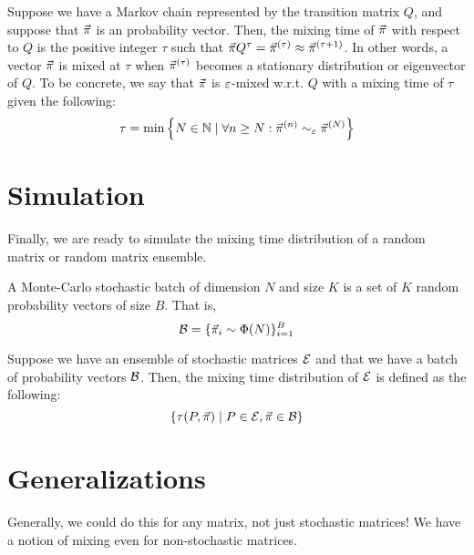 \begin{definition}
Suppose we have a Markov chain represented by the transition matrix $Q$, and suppose that $\vec{\pi}$ is an probability vector.
Then, the mixing time of $\vec{\pi}$ with respect to $Q$ is the positive integer $\tau$ such that $\vec{\pi} Q^\tau = \vec{\pi}^{(\tau)} \approx \vec{\pi}^{(\tau + 1)}$.
In other words, a vector $\vec{\pi}$ is mixed at $\tau$ when $\vec{\pi}^{(\tau)}$ becomes a stationary distribution or eigenvector of $Q$.
To be concrete, we say that $\vec{\pi}$ is $\varepsilon$-mixed w.r.t. $Q$ with a mixing time of $\tau$ given the following:
$$\tau = \min\left\{ N \in \mathbb{N} \mid \forall n \geq N : \vec{\pi}^{(n)} \sim_{\varepsilon} \vec{\pi}^{(N)} \right\} $$
\end{definition}



\newpage

\section{Simulation}

Finally, we are ready to simulate the mixing time distribution of a random matrix or random matrix ensemble.

\begin{definition}
A Monte-Carlo stochastic batch of dimension $N$ and size $K$ is a set of $K$ random probability vectors of size $B$. That is,
$$\mathcal{B} = \{\vec{\pi}_i \sim \Phi(N) \}_{i = 1}^{B}$$
\end{definition}



\begin{definition}
Suppose we have an ensemble of stochastic matrices $\mathcal{E}$ and that we have a batch of probability vectors $\mathcal{B}$.
Then, the mixing time distribution of $\mathcal{E}$ is defined as the following:
$$\{\tau(P, \vec{\pi}) \mid P \in \mathcal{E}, \vec{\pi} \in \mathcal{B} \}$$
\end{definition}


\section{Generalizations}

Generally, we could do this for any matrix, not just stochastic matrices! We have a notion of mixing even for non-stochastic matrices.

